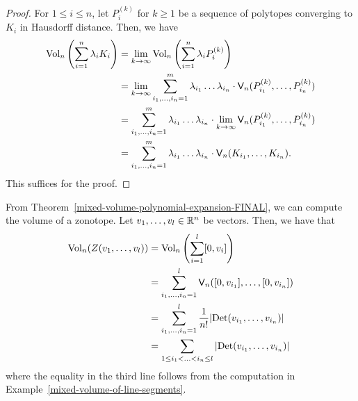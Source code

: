 \documentclass{puthesis-UG}
\begin{document}
\begin{proof}
	For $1 \leq i \leq n$, let $P_i^{(k)}$ for $k \geq 1$ be a sequence of polytopes converging to $K_i$ in Hausdorff distance. Then, we have 
	\begin{align*}
		\operatorname{Vol}_n \left ( \sum_{i = 1}^n \lambda_i K_i \right ) & = \lim_{k \to \infty} \operatorname{Vol}_n \left ( \sum_{i = 1}^n \lambda_i P_i^{(k)} \right ) \\
		& = \lim_{k \to \infty} \sum_{i_1 , \ldots , i_n = 1}^m \lambda_{i_1} \ldots \lambda_{i_n} \cdot \mathsf{V}_n (P_{i_1}^{(k)}, \ldots, P_{i_n}^{(k)}) \\
		& = \sum_{i_1 , \ldots , i_n = 1}^m \lambda_{i_1} \ldots \lambda_{i_n} \cdot \lim_{k \to \infty} \mathsf{V}_n (P_{i_1}^{(k)}, \ldots, P_{i_n}^{(k)}) \\
		& = \sum_{i_1 , \ldots , i_n = 1}^m \lambda_{i_1} \ldots \lambda_{i_n} \cdot \mathsf{V}_n (K_{i_1}, \ldots, K_{i_n}).
	\end{align*}
	This suffices for the proof. 
\end{proof}

\begin{example} \label{example-volume-of-a-zonotope}
	From Theorem~\ref{mixed-volume-polynomial-expansion-FINAL}, we can compute the volume of a zonotope. Let $v_1, \ldots, v_l \in \mathbb{R}^n$ be vectors. Then, we have that 
	\begin{align*}
		\operatorname{Vol}_n (Z(v_1, \ldots, v_l)) & = \operatorname{Vol}_n \left ( \sum_{i = 1}^l [0, v_i] \right ) \\
		& = \sum_{i_1, \ldots, i_n = 1}^l \mathsf{V}_n ([0, v_{i_1}], \ldots, [0, v_{i_n}]) \\
		& = \sum_{i_1, \ldots, i_n = 1}^l \frac{1}{n!} |\text{Det}(v_{i_1}, \ldots, v_{i_n}) | \\
		& = \sum_{1 \leq i_1 < \ldots < i_n \leq l} |\text{Det}(v_{i_1}, \ldots, v_{i_n})|
	\end{align*}
	where the equality in the third line follows from the computation in Example~\ref{mixed-volume-of-line-segments}. 
\end{example}
\end{document}
